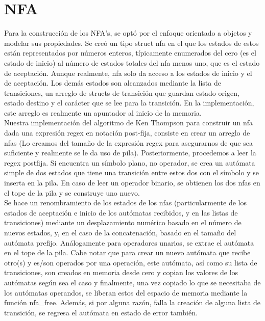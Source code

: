 \documentclass[12pt, letterpaper]{article}
\begin{document}
\section{NFA} 
\noindent Para la construcción de los NFA's, se optó por el enfoque orientado a objetos y modelar sus propiedades. Se creó un tipo struct nfa en el que los estados de estos están representados por números enteros, típicamente enumerados del cero (es el estado de inicio) al número de estados totales del nfa menos uno, que es el estado de aceptación. Aunque realmente, nfa solo da acceso a los estados de inicio y el de aceptación. Los demás estados son alcanzados mediante la lista de transiciones, un arreglo de structs de transición que guardan estado origen, estado destino y el carácter que se lee para la transición. En la implementación, este arreglo es realmente un apuntador al inicio de la memoria.\\
Nuestra implementación del algoritmo de Ken Thompson para construir un nfa dada una expresión regex en notación post-fija, consiste en crear un arreglo de nfas (Lo creamos del tamaño de la expresión regex para asegurarnos de que sea suficiente y realmente se le da uso de pila). Posteriormente, procedemos a leer la regex postfija. Si encuentra un símbolo plano, no operador, se crea un autómata simple de dos estados que tiene una transición entre estos dos con el símbolo y se inserta en la pila. En caso de leer un operador binario, se obtienen los dos nfas en el tope de la pila y se construye uno nuevo.\\
Se hace un renombramiento de los estados de los nfas (particularmente de los estados de aceptación e inicio de los autómatas recibidos, y en las listas de transiciones) mediante un desplazamiento numérico basado en el número de nuevos estados, y, en el caso de la concatenación, basado en el tamaño del autómata prefijo. Análogamente para operadores unarios, se extrae el autómata en el tope de la pila. Cabe notar que para crear un nuevo autómata que recibe otro(s) y es/son operados por una operación, este autómata, así como su lista de transiciones, son creados en memoria desde cero y copian los valores de los autómatas según sea el caso y finalmente, una vez copiado lo que se necesitaba de los autómatas operandos, se liberan estos del espacio de memoria mediante la función nfa\_free. Además, si por alguna razón, falla la creación de alguna lista de transición, se regresa el autómata en estado de error también.
\end{document}
